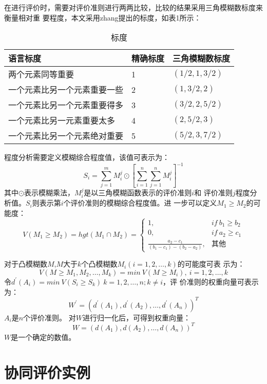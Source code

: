 \documentclass[winfonts,UTF8]{ctexart}
\begin{document}
在进行评价时，需要对评价准则进行两两比较，比较的结果采用三角模糊数标度来衡量相对重
要程度，本文采用zhang提出的标度，如表1所示：
\begin{table}
  \centering
 \caption{标度}
  \begin{tabular}{lll}
    语言标度&精确标度&三角模糊数标度\\\hline
    两个元素同等重要&1&$(1/2,1,3/2)$\\
    一个元素比另一个元素重要一些&2&$(1,3/2,2)$\\
    一个元素比另一个元素重要得多&3&$(3/2,2,5/2)$\\
    一个元素比另一元素重要太多&4&$(2,5/2,3)$\\
    一个元素比另一个元素绝对重要&5&$(5/2,3,7/2)$\\
  \end{tabular}
 
\end{table}
程度分析需要定义模糊综合程度值，该值可表示为：
\[
S_i=\sum^m_{j=1}M^j_{i}\odot
\left[\sum_{i=1}^n\sum_{j=1}^nM_{i}^j\right]^{-1}
\]
其中$\odot$表示模糊乘法，$M_{i}^j$是以三角模糊函数表示的评价准则$i$和
评价准则$j$程度分析值。$S_i$则表示第$i$个评价准则的模糊综合程度值。进
一步可以定义$M_1\geq M_2$的可能度：
\[V(M_1 \geq M_2)= hgt(M_1\cap M_2)=
\left\{
    \begin{array}{lll}
      1,& if \ b_1 \geq b_2\\
      0,& if \ a_2 \geq c_1\\
      \frac{a_2-c_1}{(b_1-c_1)-(b_2-a_2)},&\mbox{其他}
    \end{array}
  \right.
\]

对于凸模糊数$M$,$M$大于$k$个凸模糊数$M_i(i=1,2,\ldots,k)$的可能度可表
示为：
\[
V(M \geq M_1,M_2,\ldots,M_k)=min \ V(M \geq M_i),\ i=1,2,\ldots,k 
\]
令$d^{'} (A_i)=min \ V(S_i \geq S_k) \ k=1,2,\ldots,n; k \not= i$，评
价准则的权重向量可表示为：
\[
W^{'}=(d^{'}(A_1),d^{'}(A_2),\ldots,d^{'}(A_n))^T
\]
$A_i$是$n$个评价准则。
对$W$进行归一化后，可得到权重向量：
\[
W=(d(A_1),d(A_2),\ldots,d(A_n))^T
\]
$W$是一个确定的数值。

\section{协同评价实例}
\end{document}
